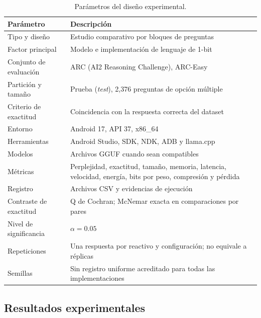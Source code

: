 \begin{table}[H]
\centering
\small
\caption{Parámetros del diseño experimental.}
\label{tab:parametros_experimentales}
\begin{tabular}{L{4.1cm}L{10.4cm}}
\toprule
Parámetro & Descripción \\
\midrule
Tipo y diseño & Estudio comparativo por bloques de preguntas \\
Factor principal & Modelo e implementación de lenguaje de 1-bit \\
Conjunto de evaluación & ARC (AI2 Reasoning Challenge), ARC-Easy \\
Partición y tamaño & Prueba (\textit{test}), 2,376 preguntas de opción múltiple \\
Criterio de exactitud & Coincidencia con la respuesta correcta del dataset \\
Entorno & Android 17, API 37, x86\_64 \\
Herramientas & Android Studio, SDK, NDK, ADB y llama.cpp \\
Modelos & Archivos GGUF cuando sean compatibles \\
Métricas & Perplejidad, exactitud, tamaño, memoria, latencia, velocidad, energía, bits por peso, compresión y pérdida \\
Registro & Archivos CSV y evidencias de ejecución \\
Contraste de exactitud & Q de Cochran; McNemar exacta en comparaciones por pares \\
Nivel de significancia & $\alpha=0.05$ \\
Repeticiones & Una respuesta por reactivo y configuración; no equivale a réplicas \\
Semillas & Sin registro uniforme acreditado para todas las implementaciones \\
\bottomrule
\end{tabular}
\end{table}


\subsection{Resultados experimentales} \label{sec:resultados_experimentales} %

